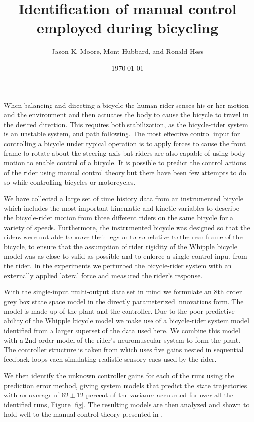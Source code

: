 \documentclass{article}
\title{Identification of manual control employed during bicycling}
\author{Jason K. Moore, Mont Hubbard, and Ronald Hess}
\date{\today}
\begin{document}
\maketitle

When balancing and directing a bicycle the human rider senses his or her motion
and the environment and then actuates the body to cause the bicycle to travel
in the desired direction. This requires both stabilization, as the
bicycle-rider system is an unstable system, and path following. The most
effective control input for controlling a bicycle under typical operation is to
apply forces to cause the front frame to rotate about the steering axis but
riders are also capable of using body motion to enable control of a bicycle.
It is possible to predict the control actions of the rider using manual control
theory but there have been few attempts to do so while controlling bicycles or
motorcycles.

We have collected a large set of time history data from an instrumented bicycle
which includes the most important kinematic and kinetic variables to describe
the bicycle-rider motion from three different riders on the same bicycle for a
variety of speeds. Furthermore, the instrumented bicycle was designed so that
the riders were not able to move their legs or torso relative to the rear frame
of the bicycle, to ensure that the assumption of rider rigidity of the Whipple
bicycle model was as close to valid as possible and to enforce a single control
input from the rider. In the experiments we perturbed the bicycle-rider system
with an externally applied lateral force and measured the rider's response.

With the single-input multi-output data set in mind we formulate an 8th order
grey box state space model \cite{Ljung1998} in the directly parameterized
innovations form. The model is made up of the plant and the controller. Due to
the poor predictive ability of the Whipple bicycle model we make use of a
bicycle-rider system model identified from a larger superset of the data used
here. We combine this model with a 2nd order model of the rider's neuromuscular
system to form the plant. The controller structure is taken from
\cite{Hess2012} which uses five gains nested in sequential feedback loops each
simulating realistic sensory cues used by the rider.

We then identify the unknown controller gains for each of the runs using the
prediction error method, giving system models that predict the state
trajectories with an average of $62 \pm 12$ percent of the variance accounted
for over all the identified runs, Figure \ref{fig}. The resulting models are
then analyzed and shown to hold well to the manual control theory presented in
\cite{Hess2012}.
\end{document}
